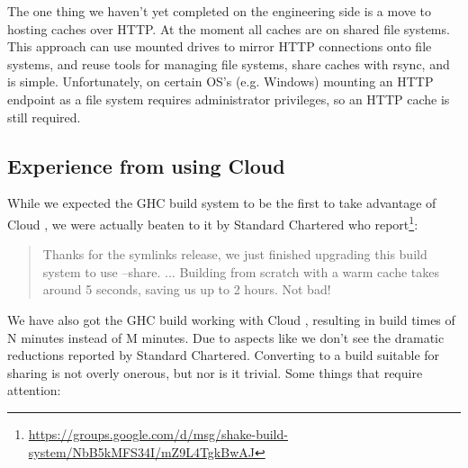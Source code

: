 The one thing we haven't yet completed on the engineering side is a move to hosting caches over HTTP. At the moment all caches are on shared file systems. This approach can use mounted drives to mirror HTTP connections onto file systems, and reuse tools for managing file systems, share caches with rsync, and is simple. Unfortunately, on certain OS's (e.g. Windows) mounting an HTTP endpoint as a file system requires administrator privileges, so an HTTP cache is still required.

\subsection{Experience from using Cloud \Shake}

While we expected the GHC build system to be the first to take advantage of Cloud \Shake, we were actually beaten to it by Standard Chartered who report\footnote{\url{https://groups.google.com/d/msg/shake-build-system/NbB5kMFS34I/mZ9L4TgkBwAJ}}:

\begin{quote}
Thanks for the symlinks release, we just finished upgrading this build system to use --share. ...
Building from scratch with a warm cache takes around 5 seconds, saving us up to 2 hours. Not bad!
\end{quote}

We have also got the GHC build working with Cloud \Shake, resulting in build times of N minutes instead of M minutes. Due to aspects like  we don't see the dramatic reductions reported by Standard Chartered. Converting to a build suitable for sharing is not overly onerous, but nor is it trivial. Some things that require attention:

